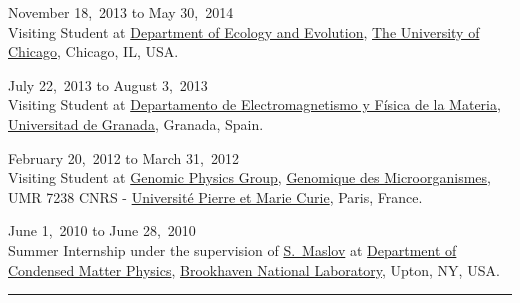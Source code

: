 \documentclass[10pt]{article}
\newcommand{\lineOa}{\hspace*{-\marginparsep minus \marginparwidth}
\begin{minipage}[t]{\textwidth+\marginparwidth+\marginparsep}
\rule{\columnwidth}{0.5pt}\end{minipage}}
\renewcommand{\section}[1]{\pagebreak[3]%
    \vspace{1.3\baselineskip}%
    \phantomsection\addcontentsline{toc}{section}{#1}%
    \noindent\llap{\scshape\smash{\parbox[t]{\marginparwidth}{\hyphenpenalty=10000\raggedright #1}}}%
    \vspace{-\baselineskip}\par}
\newcommand{\halfblankline}{\quad\vspace{-0.5\baselineskip}\pagebreak[3]}
\begin{document}
\begin{outerlist}

    \item November 18,~2013 to May 30,~2014 \\
	 Visiting Student at
	\href{http://pondside.uchicago.edu/ecol-evol/}{Department of Ecology and Evolution},
        \href{http://www.uchicago.edu/}{The University of Chicago}, Chicago, IL, USA. 

    \item July 22,~2013 to August 3,~2013 \\
	 Visiting Student at
	\href{http://ergodic.ugr.es/efm/}{Departamento de Electromagnetismo y F\'isica de la Materia},
        \href{http://www.ugr.es}{Universitad de Granada}, Granada, Spain. 

    \item February 20,~2012 to March 31,~2012 \\
	 Visiting Student at
	\href{http://www.lgm.upmc.fr/drupal/?q=node/82}{Genomic Physics Group},
 	\href{http://www.lgm.upmc.fr/}{Genomique des Microorganismes}, UMR 7238 CNRS -
        \href{http://www.upmc.fr/en/index.html}{Universit\'e Pierre et Marie Curie}, Paris, France. 
        
    \item June 1,~2010 to June 28,~2010 \\
	Summer Internship under the supervision of \href{http://www.cmth.bnl.gov/~maslov/}{S.~Maslov}
	at \href{http://www.bnl.gov/cmpmsd/}{Department of Condensed Matter Physics},
	\href{http://www.bnl.gov/world/}{Brookhaven National Laboratory}, Upton, NY, USA. 
\end{outerlist}
\halfblankline

\lineOa






\end{document}
